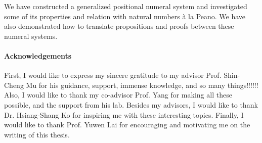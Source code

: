 \documentclass[\main/thesis.tex]{subfiles}
\begin{document}
We have constructed a generalized positional numeral system
and investigated some of its properties and relation with natural numbers à la
Peano.
We have also demonstrated how to translate propositions and proofs between these
numeral systems.

\paragraph{Acknowledgements}
First, I would like to express my sincere gratitude to my advisor Prof.
Shin-Cheng Mu  for his guidance, support, immense knowledge, and so many things!!!!!!
Also, I would like to thank my co-advisor Prof. Yang for making all these
possible, and the support from his lab.
Besides my advisors, I would like to thank Dr. Hsiang-Shang Ko for inspiring me
with these interesting topics.
Finally, I would like to thank Prof. Yuwen Lai for encouraging and motivating me
on the writing of this thesis.
\end{document}
